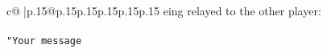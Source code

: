 \documentclass{article}
\begin{document}
{\begin{supertabular}{c@{$\;$}|p{.15\linewidth}@{}p{.15\linewidth}p{.15\linewidth}p{.15\linewidth}p{.15\linewidth}p{.15\linewidth}}
{{{eing relayed to the other player:\\ \tt \\ \tt "Your message }}}
\end{supertabular}}
\end{document}
